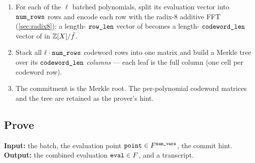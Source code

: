 \begin{enumerate}
  \item For each of the $\ell$ batched polynomials, split its
    evaluation vector into $\texttt{num\_rows}$ rows and encode each row
    with the radix-8 additive FFT (\autoref{sec:radix8}): a length-%
    $\texttt{row\_len}$ vector of  becomes a length-%
    $\texttt{codeword\_len}$ vector of  in $\mathbb{Z}[X]/\tilde f$.
  \item Stack all $\ell \cdot \texttt{num\_rows}$ codeword rows into one
    matrix and build a Merkle tree over its $\texttt{codeword\_len}$
    \emph{columns} --- each leaf is the full column (one 
    cell per codeword row).
  \item The commitment is the Merkle root. The per-polynomial codeword
    matrices and the tree are retained as the prover's hint.
\end{enumerate}

\subsection{Prove}
\label{sec:prove}

\textbf{Input:} the batch, the evaluation point
$\texttt{point} \in F^{\texttt{num\_vars}}$, the commit hint.
\textbf{Output:} the combined evaluation $\texttt{eval} \in F$, and a
transcript.

